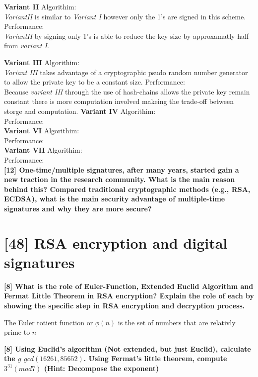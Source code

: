 \documentclass[letterpaper,11pt,notitlepage,fleqn]{article}
\begin{document}
\textbf{Variant II}
\noindent Algorithim:\\
\indent \textit{VariantII} is similar to \textit{Variant I} however only the 1's are signed in this scheme. 
\noindent Performance:\\
\indent \textit{VariantII} by signing only 1's is able to reduce the key size by approxamatly half from \textit{variant I}.

\textbf{Variant III}
\noindent Algorithim:\\
\indent \textit{Variant III} takes advantage of a cryptographic psudo random number generator to allow the private key to be a constant size. 
\noindent Performance:\\
\indent Because \textit{variant III} through the use of hash-chains allows the private key remain constant there is more computation involved makeing the trade-off between storge and computation. 
\textbf{Variant IV}
\noindent Algorithim:\\
\indent  
\noindent Performance:\\
\textbf{Variant VI}
\noindent Algorithim:\\
\indent
\noindent Performance:\\
\textbf{Variant VII}
\noindent Algorithim:\\
\noindent Performance:\\
 

\noindent \textbf{[12] One-time/multiple signatures, after many years, started gain a new traction in  the  research  community.  What  is  the  main  reason  behind  this?  Compared traditional cryptographic methods  (e.g., RSA, ECDSA), what  is  the main security advantage of multiple-time signatures and why they are more secure?}  

\section{[48] RSA encryption and digital signatures}

\noindent \textbf{[8]  What  is  the  role  of  Euler-Function,  Extended  Euclid  Algorithm  and  Fermat Little  Theorem  in  RSA  encryption?  Explain  the  role  of  each  by  showing  the specific step in RSA encryption and decryption process.}

The Euler totient function or $\phi(n)$ is the set of numbers that are relativly prime to $n$

\noindent \textbf{[8] Using Euclid’s algorithm (Not extended, but just Euclid), calculate the $g$ $gcd(16261,  85652)$.  Using  Fermat’s  little  theorem,  compute  $3^{31}  (mod  7)$  (Hint: Decompose the exponent)} 
\end{document}
